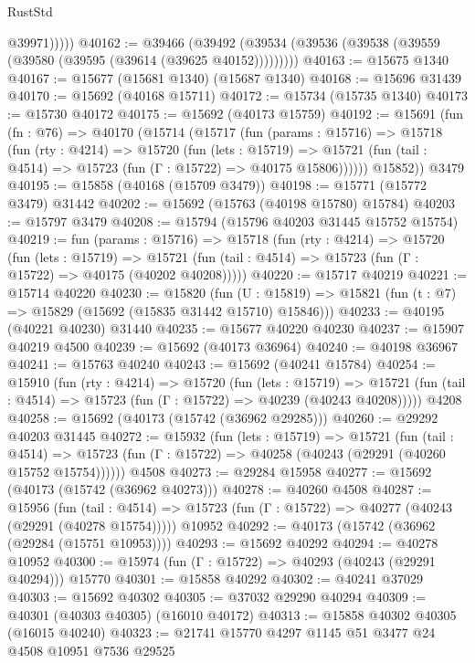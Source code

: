 \begin{lexlean}{RustStd}
\begin{coremodule}
              @39971)))))
@40162 := @39466
    (@39492 (@39534 (@39536 (@39538 (@39559 (@39580 (@39595 (@39614 (@39625 @40152)))))))))
@40163 := @15675 @1340
@40167 := @15677 (@15681 @1340) (@15687 @1340)
@40168 := @15696 @31439
@40170 := @15692 (@40168 @15711)
@40172 := @15734 (@15735 @1340)
@40173 := @15730 @40172
@40175 := @15692 (@40173 @15759)
@40192 := @15691
    (fun (fn : @76) =>
    @40170
      (@15714
        (@15717
          (fun (params : @15716) =>
          @15718
            (fun (rty : @4214) =>
            @15720
              (fun (lets : @15719) =>
              @15721 (fun (tail : @4514) => @15723 (fun (Γ : @15722) => @40175 @15806))))))
        @15852))
    @3479
@40195 := @15858 (@40168 (@15709 @3479))
@40198 := @15771 (@15772 @3479) @31442
@40202 := @15692 (@15763 (@40198 @15780) @15784)
@40203 := @15797 @3479
@40208 := @15794 (@15796 @40203 @31445 @15752 @15754)
@40219 := fun (params : @15716) =>
  @15718
    (fun (rty : @4214) =>
    @15720
      (fun (lets : @15719) =>
      @15721 (fun (tail : @4514) => @15723 (fun (Γ : @15722) => @40175 (@40202 @40208)))))
@40220 := @15717 @40219
@40221 := @15714 @40220
@40230 := @15820
    (fun (U : @15819) => @15821 (fun (t : @7) => @15829 (@15692 (@15835 @31442 @15710) @15846)))
@40233 := @40195 (@40221 @40230) @31440
@40235 := @15677 @40220 @40230
@40237 := @15907 @40219 @4500
@40239 := @15692 (@40173 @36964)
@40240 := @40198 @36967
@40241 := @15763 @40240
@40243 := @15692 (@40241 @15784)
@40254 := @15910
    (fun (rty : @4214) =>
    @15720
      (fun (lets : @15719) =>
      @15721 (fun (tail : @4514) => @15723 (fun (Γ : @15722) => @40239 (@40243 @40208)))))
    @4208
@40258 := @15692 (@40173 (@15742 (@36962 @29285)))
@40260 := @29292 @40203 @31445
@40272 := @15932
    (fun (lets : @15719) =>
    @15721
      (fun (tail : @4514) =>
      @15723 (fun (Γ : @15722) => @40258 (@40243 (@29291 (@40260 @15752 @15754))))))
    @4508
@40273 := @29284 @15958
@40277 := @15692 (@40173 (@15742 (@36962 @40273)))
@40278 := @40260 @4508
@40287 := @15956
    (fun (tail : @4514) => @15723 (fun (Γ : @15722) => @40277 (@40243 (@29291 (@40278 @15754)))))
    @10952
@40292 := @40173 (@15742 (@36962 (@29284 (@15751 @10953))))
@40293 := @15692 @40292
@40294 := @40278 @10952
@40300 := @15974 (fun (Γ : @15722) => @40293 (@40243 (@29291 @40294))) @15770
@40301 := @15858 @40292
@40302 := @40241 @37029
@40303 := @15692 @40302
@40305 := @37032 @29290 @40294
@40309 := @40301 (@40303 @40305) (@16010 @40172)
@40313 := @15858 @40302 @40305 (@16015 @40240)
@40323 := @21741 @15770 @4297 @1145 @51 @3477 @24 @4508 @10951 @7536 @29525

\end{coremodule}
\end{lexlean}
